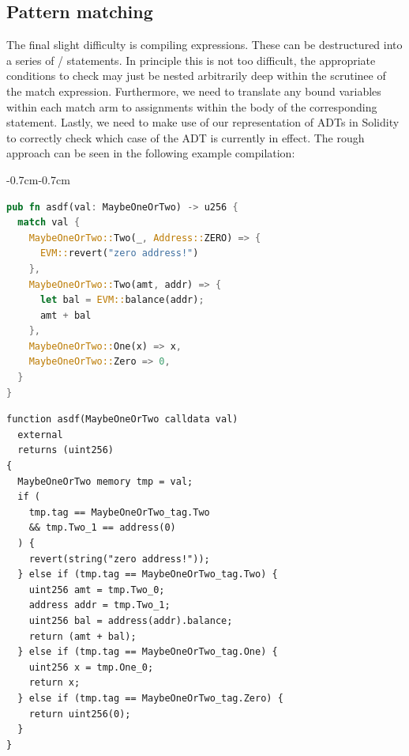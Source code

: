 \subsection{Pattern matching}
The final slight difficulty is compiling  expressions. These can be destructured into a series of  /  statements. In principle this is not too difficult, the appropriate conditions to check may just be nested arbitrarily deep within the scrutinee of the match expression. Furthermore, we need to translate any bound variables within each match arm to assignments within the body of the corresponding  statement. Lastly, we need to make use of our representation of ADTs in Solidity to correctly check which case of the ADT is currently in effect. The rough approach can be seen in the following example compilation:

\begin{changemargin}{-0.7cm}{-0.7cm} 
\noindent\begin{minipage}[t]{.5\textwidth + 0.33cm}
\begin{lstlisting}[language=Rust, style=boxed, basicstyle=\ttfamily\footnotesize]
pub fn asdf(val: MaybeOneOrTwo) -> u256 {
  match val {
    MaybeOneOrTwo::Two(_, Address::ZERO) => {
      EVM::revert("zero address!")
    },
    MaybeOneOrTwo::Two(amt, addr) => {
      let bal = EVM::balance(addr);
      amt + bal
    },
    MaybeOneOrTwo::One(x) => x,
    MaybeOneOrTwo::Zero => 0,
  }
}
\end{lstlisting}
\end{minipage}
\begin{minipage}[t]{.5\textwidth + 1.07cm}
\begin{lstlisting}[language=Solidity, style=boxedSol, basicstyle=\ttfamily\footnotesize]
function asdf(MaybeOneOrTwo calldata val)
  external
  returns (uint256)
{
  MaybeOneOrTwo memory tmp = val;
  if (
    tmp.tag == MaybeOneOrTwo_tag.Two
    && tmp.Two_1 == address(0)
  ) {
    revert(string("zero address!"));
  } else if (tmp.tag == MaybeOneOrTwo_tag.Two) {
    uint256 amt = tmp.Two_0;
    address addr = tmp.Two_1;
    uint256 bal = address(addr).balance;
    return (amt + bal);
  } else if (tmp.tag == MaybeOneOrTwo_tag.One) {
    uint256 x = tmp.One_0;
    return x;
  } else if (tmp.tag == MaybeOneOrTwo_tag.Zero) {
    return uint256(0);
  }
}
\end{lstlisting}
\end{minipage}
\end{changemargin}

